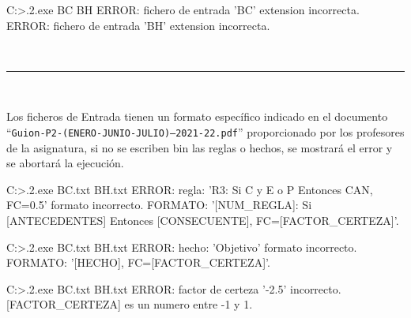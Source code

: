 \begin{listing}[style=consola]
C:\Users\ElenaPerez\SBR\bin\Debug>.\practica2.exe BC BH
ERROR: fichero de entrada 'BC' extension incorrecta.
ERROR: fichero de entrada 'BH' extension incorrecta.
\end{listing}
\newpage
\begin{center}
	{\fboxrule=4pt } \\
	\setcounter{chapter}{3}
	\setcounter{section}{0}
	\rule{15cm}{0pt} \\
\end{center}
\par Los ficheros de Entrada tienen un formato específico indicado en el documento ``\texttt{Guion-P2-(ENERO-JUNIO-JULIO)--2021-22.pdf}'' proporcionado por los profesores de la asignatura, si no se escriben bin las reglas o
hechos, se mostrará el error y se abortará la ejecución.
\begin{listing}[style=consola]
C:\Users\ElenaPerez\SBR\bin\Debug>.\practica2.exe BC.txt BH.txt
ERROR: regla: 'R3: Si C y E o P Entonces CAN, FC=0.5' formato incorrecto.
FORMATO: '[NUM_REGLA]: Si [ANTECEDENTES] Entonces [CONSECUENTE], FC=[FACTOR_CERTEZA]'.  
\end{listing}
\begin{listing}[style=consola]
C:\Users\ElenaPerez\SBR\bin\Debug>.\practica2.exe BC.txt BH.txt
ERROR: hecho: 'Objetivo' formato incorrecto.
FORMATO: '[HECHO], FC=[FACTOR_CERTEZA]'.
\end{listing}
\begin{listing}[style=consola]
C:\Users\ElenaPerez\SBR\bin\Debug>.\practica2.exe BC.txt BH.txt
ERROR: factor de certeza '-2.5' incorrecto.
[FACTOR_CERTEZA] es un numero entre -1 y 1.
\end{listing}

